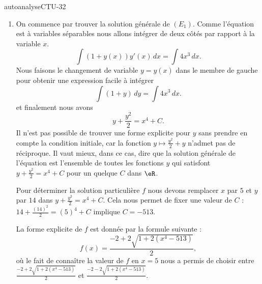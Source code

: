 
\begin{corrige}{autoanalyseCTU-32}

\begin{enumerate}
\item On commence par trouver la solution générale de $(E_{1})$. Comme l'équation est à variables séparables nous allons intégrer de deux c\^otés par rapport à la variable $x$. 
\[
\int (1+y(x))y'(x)\, dx = \int 4x^3\, dx.
\]
Nous faisons le changement de variable $y = y(x) $ dans le membre de gauche pour obtenir une expression facile à intégrer 
\[
\int (1+y)\, dy = \int 4x^3\, dx.
\]
et finalement nous avons 
\[
y+ \frac{y^2}{2} = x^4 + C.
\]
Il n'est pas possible de trouver une forme explicite pour $y$ sans prendre en compte la condition initiale, car la fonction $y\mapsto  \frac{y^2}{2}+ y $ n'admet pas de réciproque. Il vaut mieux, dans ce cas, dire que la solution générale de l'équation est l'ensemble de toutes les  fonctions $y$ qui satisfont $y+ \frac{y^2}{2} = x^4 + C$ pour un quelque $C$ dans $\eR$. 

Pour déterminer la solution particulière $f$ nous devons remplacer $x$ par $5$ et $y$ par $14$ dans $y+ \frac{y^2}{2} = x^4 + C$. Cela nous permet de fixer une valeur de $C$ : $14+ \frac{(14)^2}{2}  = (5)^4 + C$ implique $ C=-513$. 

La forme explicite de $f$ est donnée par la formule suivante :
\[
f(x) = \frac{-2+ 2\sqrt{1 + 2 (x^4 - 513)}}{2},
\] 
où le fait de conna\^{i}tre la valeur de $f$ en $x=5$ nous a permis de choisir entre $\displaystyle \frac{-2+ 2\sqrt{1 + 2 (x^4 - 513)}}{2}$ et $\displaystyle \frac{-2- 2\sqrt{1 + 2 (x^4 - 513)}}{2}$.
  

\end{enumerate}
\end{corrige}
